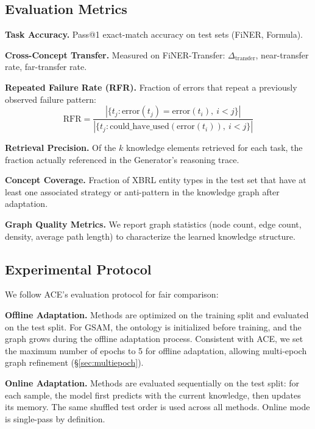 \documentclass[12pt,a4paper]{article}
\begin{document}
\subsection{Evaluation Metrics}

\textbf{Task Accuracy.} Pass@1 exact-match accuracy on test sets (FiNER, Formula).

\textbf{Cross-Concept Transfer.} Measured on FiNER-Transfer: $\Delta_{\text{transfer}}$, near-transfer rate, far-transfer rate.

\textbf{Repeated Failure Rate (RFR).} Fraction of errors that repeat a previously observed failure pattern:
\begin{equation}
\text{RFR} = \frac{|\{t_j : \text{error}(t_j) = \text{error}(t_i),\ i < j\}|}{|\{t_j : \text{could\_have\_used}(\text{error}(t_i)),\ i < j\}|}
\end{equation}

\textbf{Retrieval Precision.} Of the $k$ knowledge elements retrieved for each task, the fraction actually referenced in the Generator's reasoning trace.

\textbf{Concept Coverage.} Fraction of XBRL entity types in the test set that have at least one associated strategy or anti-pattern in the knowledge graph after adaptation.

\textbf{Graph Quality Metrics.} We report graph statistics (node count, edge count, density, average path length) to characterize the learned knowledge structure.

\subsection{Experimental Protocol}

We follow ACE's evaluation protocol for fair comparison:

\textbf{Offline Adaptation.} Methods are optimized on the training split and evaluated on the test split. For GSAM, the ontology is initialized before training, and the graph grows during the offline adaptation process. Consistent with ACE, we set the maximum number of epochs to 5 for offline adaptation, allowing multi-epoch graph refinement (\S\ref{sec:multiepoch}).

\textbf{Online Adaptation.} Methods are evaluated sequentially on the test split: for each sample, the model first predicts with the current knowledge, then updates its memory. The same shuffled test order is used across all methods. Online mode is single-pass by definition.
\end{document}
